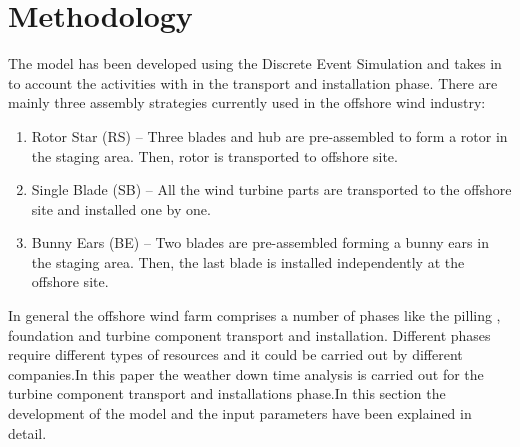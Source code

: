 \section{Methodology}
The model has been developed using the Discrete Event Simulation and takes in to account the activities with in the transport and installation phase. There are mainly three assembly strategies currently used in the offshore wind industry:

\begin{enumerate}
\item Rotor Star (RS) -- Three blades and hub are pre-assembled to form a rotor in the staging area. Then, rotor is transported to offshore site.
\item Single Blade (SB) -- All the wind turbine parts are transported to the offshore site and installed one by one.
\item Bunny Ears (BE) -- Two blades are pre-assembled forming a bunny ears in the staging area. Then, the last blade is installed independently at the offshore site.
\end{enumerate}In general the offshore wind farm comprises a number of phases like the pilling , foundation and turbine component transport and installation. Different phases require different types of resources and it could be carried out by different companies.In this paper the weather down time analysis is carried out for the turbine component transport and installations phase.In this section the development of the model and the input  parameters have been explained in detail.